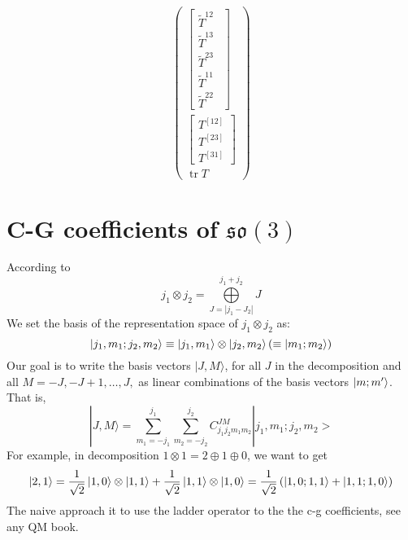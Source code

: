\documentclass{article}
\begin{document}
\begin{equation*}
\begin{pmatrix}
\begin{bmatrix}
				\tilde{T}^{12}\\
				\tilde{T}^{13}\\
				\tilde{T}^{23}\\
				\tilde{T}^{11}\\
				\tilde{T}^{22} \ \ 
			\end{bmatrix}\\
			\begin{bmatrix}
				T^{[ 12]}\\
				T^{[ 23]}\\
				T^{[ 31]}
			\end{bmatrix}\\
			\operatorname{tr} T
		\end{pmatrix}
	\end{equation*}
	$ $ 
	\section{C-G coefficients of $\mathfrak{so}( 3)$}
	
	According to
	\begin{equation*}
		j_{1} \otimes j_{2} =\underset{J=| j_{1} -J_{2}| }{\overset{j_{1} +j_{2}}{\bigoplus }} J
	\end{equation*}
	We set the basis of the representation space of $j_{1} \otimes j_{2}$ as:
	\begin{equation*}
		\ket{j_{1} ,m_{1} ;j_{2} ,m_{2}} \equiv \ket{j_{1} ,m_{1}} \otimes \ket{j_{2} ,m_{2}}\left( \equiv \ket{m_{1} ;m_{2}}\right)
	\end{equation*}
	Our goal is to write the basis vectors $|J,M\rangle $, for all $J$ in the decomposition and all $M=-J,-J+1,\dotsc ,J,$ as linear combinations of the basis vectors $\ket{m;m'}$. That is,
	\begin{equation}
		|J,M\rangle =\sum _{m_{1} =-j_{1}}^{j_{1}}\sum _{m_{2} =-j_{2}}^{j_{2}} C_{j_{1} j_{2} m_{1} m_{2}}^{JM}| j_{1} ,m_{1} ;j_{2} ,m_{2}> 
	\end{equation}
	For example, in decomposition $1\otimes 1=2\oplus 1\oplus 0$, we want to get
	\begin{equation*}
		\ket{2,1} =\frac{1}{\sqrt{2}}\ket{1,0} \otimes \ket{1,1} +\frac{1}{\sqrt{2}}\ket{1,1} \otimes \ket{1,0} =\frac{1}{\sqrt{2}}\left(\ket{1,0;1,1} +\ket{1,1;1,0}\right)
	\end{equation*}
	The naive approach it to use the ladder operator to the the c-g coefficients, see any QM book. 
	
\end{document}
